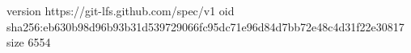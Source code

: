 version https://git-lfs.github.com/spec/v1
oid sha256:eb630b98d96b93b31d539729066fc95dc71e96d84d7bb72e48c4d31f22e30817
size 6554
